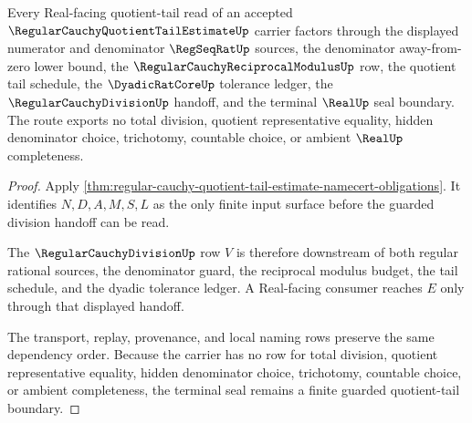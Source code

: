 \begin{theorem}
\label{thm:regular-cauchy-quotient-tail-estimate-real-seal-boundary}
Every Real-facing quotient-tail read of an accepted $\RegularCauchyQuotientTailEstimateUp$ carrier factors through the displayed numerator and denominator $\RegSeqRatUp$ sources, the denominator away-from-zero lower bound, the $\RegularCauchyReciprocalModulusUp$ row, the quotient tail schedule, the $\DyadicRatCoreUp$ tolerance ledger, the $\RegularCauchyDivisionUp$ handoff, and the terminal $\RealUp$ seal boundary. The route exports no total division, quotient representative equality, hidden denominator choice, trichotomy, countable choice, or ambient $\RealUp$ completeness.
\end{theorem}
\begin{proof}
Apply \autoref{thm:regular-cauchy-quotient-tail-estimate-namecert-obligations}. It identifies $N,D,A,M,S,L$ as the only finite input surface before the guarded division handoff can be read.

The $\RegularCauchyDivisionUp$ row $V$ is therefore downstream of both regular rational sources, the denominator guard, the reciprocal modulus budget, the tail schedule, and the dyadic tolerance ledger. A Real-facing consumer reaches $E$ only through that displayed handoff.

The transport, replay, provenance, and local naming rows preserve the same dependency order. Because the carrier has no row for total division, quotient representative equality, hidden denominator choice, trichotomy, countable choice, or ambient completeness, the terminal seal remains a finite guarded quotient-tail boundary.
\end{proof}

